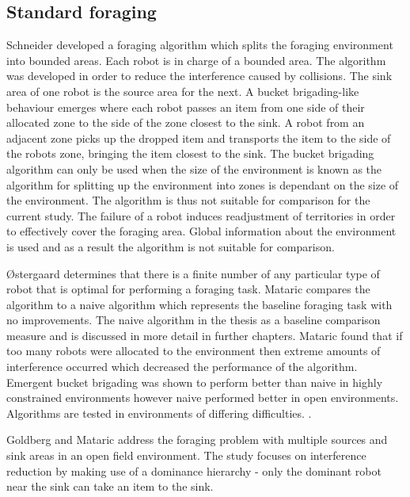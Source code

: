 \subsection{Standard foraging}
\label{standardforaging}

Schneider \cite{schneider1998territorial} developed a foraging algorithm which splits the foraging environment into bounded areas. Each robot is in charge of a bounded area. The algorithm was developed in order to reduce the interference caused by collisions. The sink area of one robot is the source area for the next. A bucket brigading-like behaviour emerges where each robot passes an item from one side of their allocated zone to the side of the zone closest to the sink. A robot from an adjacent zone picks up the dropped item and transports the item to the side of the robots zone, bringing the item closest to the sink. The bucket brigading algorithm can only be used when the size of the environment is known as the algorithm for splitting up the environment into zones is dependant on the size of the environment. The algorithm is thus not suitable for comparison for the current study. The failure of a robot induces readjustment of territories in order to effectively cover the foraging area. Global information about the environment is used and as a result the algorithm is not suitable for comparison. %

\O stergaard \cite{ostergaard2001emergent} determines that there is a finite number of any particular type of robot that is optimal for performing a foraging task. Mataric compares the algorithm to a naive algorithm which represents the baseline foraging task with no improvements. The naive algorithm in the thesis as a baseline comparison measure and is discussed in more detail in further chapters. Mataric found that if too many robots were allocated to the environment then extreme amounts of interference occurred which decreased the performance of the algorithm. Emergent bucket brigading was shown to perform better than naive in highly constrained environments however naive performed better in open environments. Algorithms are tested in environments of differing difficulties.
. %

Goldberg and Mataric \cite{Goldberg01designand} address the foraging problem with multiple sources and sink areas in an open field environment. The study focuses on interference reduction by making use of a dominance hierarchy - only the dominant robot near the sink can take an item to the sink. %


